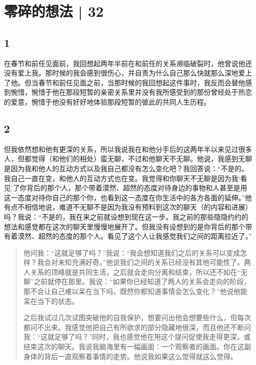 \chapter{零碎的想法 | 32}




\section*{1}

在春节和前任见面前，我回想起两年半前在和前任的关系濒临破裂时，他曾说他还没有爱上我。那时候的我会感到很伤心，并自责为什么自己那么快就那么深地爱上了他。但当春节和前任见面之前，当那时候的我回想起这件事时，我反而会替他感到惋惜，惋惜于他在那段短暂的亲密关系里并没有我所感受到的那份曾经处于热恋的爱意，惋惜于他没有好好地体验那段短暂的彼此的共同人生历程。


\section*{2}

但我依然想和他有更深的关系，所以我说我在和他分手后的这两年半以来见过很多人，但都觉得（和他们的相处）蛮无聊，不过和他聊天不无聊。他说，我感到无聊是因为我和他人的互动方式以及我自己都没有怎么变化吧？我回答说：“不是的。我自己一直在变，和他人的互动方式也在变。我觉得和你聊天不无聊是因为我‘看见’了你背后的那个人，那个带着漠然、超然的态度对待身边的事物和人甚至是用这一态度对待你自己的那个你，也看到这一态度在你生活中的各方各面的延伸。”他有点不相信地说，难道不无聊不是因为我没有预料到这次的聊天（的内容和进展）吗？我说：“不是的，我在来之前就设想到现在这一步。我之前的那些隐隐约约的想法和感觉都在这次的聊天里慢慢地展开了。但我没有设想到的是你背后的那个带有着漠然、超然的态度的那个人。看见了这个人让我感觉我们之间的距离拉近了。”

\blockquote{
    他问我：“这就足够了吗？”我说：“我会想知道我们之后的关系可以变成怎样？我会对未知充满好奇。”他说我们之间的关系已经没有其他可能性了。两人关系的顶峰就是共同生活，之后就会走向分离和结束，所以还不如在“无聊”之前就停在那里。我说：“如果你已经知道了两人的关系会走向的阶段，那不会让自己难以呆在当下吗，既然你都知道事情会怎么变化？”他说他能呆在当下的状态。

    之后我试过几次试图突破他的自我保护，想要问出他会想要些什么，但每次都问不出来。我感觉他把自己有所欲求的部分隐藏地很深，而且他还不断问我：“这就足够了吗？”同时，我也感觉他在用这个提问促使我走得更深，或结束这次的聊天。我说我脑海里有一幅画面：一个观察者的画面。你在这副身体的背后一直观察着事情的走势。他说我如果这么觉得就这么觉得。

}

